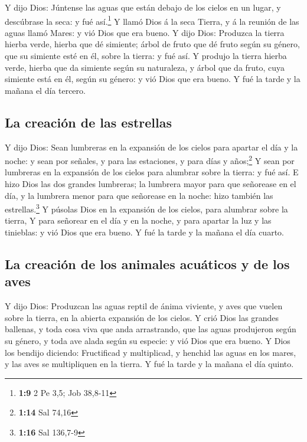  Y dijo Dios: Júntense las aguas que están debajo de los
cielos en un lugar, y descúbrase la seca: y fué así.\footnote{\textbf{1:9}
  2 Pe 3,5; Job 38,8-11}  Y llamó Dios á la seca Tierra, y
á la reunión de las aguas llamó Mares: y vió Dios que era bueno.
 Y dijo Dios: Produzca la tierra hierba verde, hierba que
dé simiente; árbol de fruto que dé fruto según su género, que su
simiente esté en él, sobre la tierra: y fué así.  Y produjo
la tierra hierba verde, hierba que da simiente según su naturaleza, y
árbol que da fruto, cuya simiente está en él, según su género: y vió
Dios que era bueno.  Y fué la tarde y la mañana el día
tercero.

\hypertarget{la-creaciuxf3n-de-las-estrellas}{%
\subsection{La creación de las
estrellas}\label{la-creaciuxf3n-de-las-estrellas}}

 Y dijo Dios: Sean lumbreras en la expansión de los cielos
para apartar el día y la noche: y sean por señales, y para las
estaciones, y para días y años;\footnote{\textbf{1:14} Sal 74,16}
 Y sean por lumbreras en la expansión de los cielos para
alumbrar sobre la tierra: y fué así.  E hizo Dios las dos
grandes lumbreras; la lumbrera mayor para que señorease en el día, y la
lumbrera menor para que señorease en la noche: hizo también las
estrellas.\footnote{\textbf{1:16} Sal 136,7-9}  Y púsolas
Dios en la expansión de los cielos, para alumbrar sobre la tierra,
 Y para señorear en el día y en la noche, y para apartar la
luz y las tinieblas: y vió Dios que era bueno.  Y fué la
tarde y la mañana el día cuarto.

\hypertarget{la-creaciuxf3n-de-los-animales-acuuxe1ticos-y-de-los-aves}{%
\subsection{La creación de los animales acuáticos y de los
aves}\label{la-creaciuxf3n-de-los-animales-acuuxe1ticos-y-de-los-aves}}

 Y dijo Dios: Produzcan las aguas reptil de ánima viviente,
y aves que vuelen sobre la tierra, en la abierta expansión de los
cielos.  Y crió Dios las grandes ballenas, y toda cosa viva
que anda arrastrando, que las aguas produjeron según su género, y toda
ave alada según su especie: y vió Dios que era bueno.  Y
Dios los bendijo diciendo: Fructificad y multiplicad, y henchid las
aguas en los mares, y las aves se multipliquen en la tierra.
 Y fué la tarde y la mañana el día quinto.

